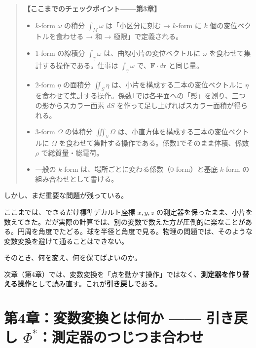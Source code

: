 \documentclass[a4paper,12pt,openany]{book}
\begin{document}
\begin{quote}
\textbf{【ここまでのチェックポイント——第3章】}

\begin{itemize}
\item
  \(k\)-form \(\omega\) の積分 \(\int_M \omega\) は「小区分に刻む →
  \(k\)-form に \(k\) 個の変位ベクトルを食わせる → 和 →
  極限」で定義される。
\item
  \(1\)-form の線積分 \(\int_\gamma \omega\)
  は、曲線小片の変位ベクトルに \(\omega\)
  を食わせて集計する操作である。仕事は \(\int_\gamma \omega\)
  で、\(\mathbf{F}\cdot d\mathbf{r}\) と同じ量。
\item
  \(2\)-form \(\eta\) の面積分 \(\iint_S \eta\)
  は、小片を構成する二本の変位ベクトルに \(\eta\)
  を食わせて集計する操作。係数1では各平面への「影」を測り、三つの影からスカラー面素
  \(dS\) を作って足し上げればスカラー面積が得られる。
\item
  \(3\)-form \(\Omega\) の体積分 \(\iiint_V \Omega\)
  は、小直方体を構成する三本の変位ベクトルに \(\Omega\)
  を食わせて集計する操作である。係数1でそのまま体積、係数 \(\rho\)
  で総質量・総電荷。
\item
  一般の \(k\)-form は、場所ごとに変わる係数（\(0\)-form）と基底
  \(k\)-form の組み合わせとして書ける。
\end{itemize}
\end{quote}

しかし、まだ重要な問題が残っている。

ここまでは、できるだけ標準デカルト座標 \(x,y,z\)
の測定器を保ったまま、小片を数えてきた。だが実際の計算では、別の変数で数えた方が圧倒的に楽なことがある。円周を角度でたどる。球を半径と角度で見る。物理の問題では、そのような変数変換を避けて通ることはできない。

そのとき、何を変え、何を保てばよいのか。

次章（第4章）では、変数変換を「点を動かす操作」ではなく、\textbf{測定器を作り替える操作}として読み直す。これが\textbf{引き戻し}である。

\newpage

\hypertarget{ux7b2c4ux7ae0ux5909ux6570ux5909ux63dbux3068ux306fux4f55ux304b-ux5f15ux304dux623bux3057-phiux6e2cux5b9aux5668ux306eux3064ux3058ux3064ux307eux5408ux308fux305b}{%
\chapter{\texorpdfstring{第4章：変数変換とは何か —— 引き戻し
\(\Phi^*\)：測定器のつじつま合わせ}{第4章：変数変換とは何か —— 引き戻し \textbackslash Phi\^{}*：測定器のつじつま合わせ}}\label{ux7b2c4ux7ae0ux5909ux6570ux5909ux63dbux3068ux306fux4f55ux304b-ux5f15ux304dux623bux3057-phiux6e2cux5b9aux5668ux306eux3064ux3058ux3064ux307eux5408ux308fux305b}}
\end{document}
